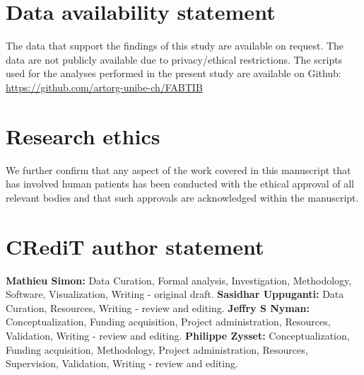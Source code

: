 \documentclass[a4paper,fleqn]{DC_ArtStyle}
\begin{document}
	\section*{Data availability statement}
	The data that support the findings of this study are available on request. The data are not publicly available due to privacy/ethical restrictions. The scripts used for the analyses performed in the present study are available on Github: \url{https://github.com/artorg-unibe-ch/FABTIB}
	
	\section*{Research ethics}
	We further confirm that any aspect of the work covered in this manuscript that has involved human patients has been conducted with the ethical approval of all relevant bodies and that such approvals are acknowledged within the manuscript.
	
	\section*{CRediT author statement}
	\textbf{Mathieu Simon:} Data Curation, Formal analysis, Investigation, Methodology, Software, Visualization, Writing - original draft.
	\textbf{Sasidhar Uppuganti:} Data Curation, Resources, Writing - review and editing.
	\textbf{Jeffry S Nyman:} Conceptualization, Funding acquisition, Project administration, Resources, Validation, Writing - review and editing.
	\textbf{Philippe Zysset:} Conceptualization, Funding acquisition, Methodology, Project administration, Resources, Supervision, Validation, Writing - review and editing.
	

	\nocite{*}
	
	


	
\end{document}
